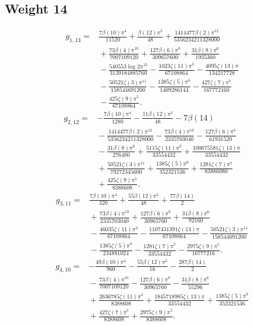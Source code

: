 \subsection*{Weight 14}
\begin{align*}g_{1,13}={}&\frac{7 \beta(10) \pi^{4}}{11520}+\frac{\beta(12) \pi^{2}}{48}+\frac{1414477 \beta(2) \pi^{12}}{5356234211328000}\\
&{}+\frac{73 \beta(4) \pi^{10}}{7007109120}+\frac{127 \beta(6) \pi^{8}}{309657600}+\frac{31 \beta(8) \pi^{6}}{1935360}\\
&{}- \frac{540553 \log 2 \pi^{13}}{3139184885760}- \frac{1023 \zeta(11) \pi^{3}}{67108864}- \frac{4095 \zeta(13) \pi}{134217728}\\
&{}- \frac{50521 \zeta(3) \pi^{11}}{158544691200}- \frac{1385 \zeta(5) \pi^{9}}{1409286144}- \frac{427 \zeta(7) \pi^{7}}{167772160}\\
&{}- \frac{425 \zeta(9) \pi^{5}}{67108864}.\end{align*}
\begin{align*}g_{2,12}={}&- \frac{7 \beta(10) \pi^{4}}{1280}- \frac{11 \beta(12) \pi^{2}}{48}- 7 \beta(14)\\
&{}- \frac{1414477 \beta(2) \pi^{12}}{5356234211328000}- \frac{73 \beta(4) \pi^{10}}{2335703040}- \frac{127 \beta(6) \pi^{8}}{61931520}\\
&{}- \frac{31 \beta(8) \pi^{6}}{276480}+\frac{5115 \zeta(11) \pi^{3}}{33554432}+\frac{100675581 \zeta(13) \pi}{33554432}\\
&{}+\frac{50521 \zeta(3) \pi^{11}}{79272345600}+\frac{1385 \zeta(5) \pi^{9}}{352321536}+\frac{1281 \zeta(7) \pi^{7}}{83886080}\\
&{}+\frac{425 \zeta(9) \pi^{5}}{8388608}.\end{align*}
\begin{align*}g_{3,11}={}&\frac{7 \beta(10) \pi^{4}}{320}+\frac{55 \beta(12) \pi^{2}}{48}+\frac{77 \beta(14)}{2}\\
&{}+\frac{73 \beta(4) \pi^{10}}{2335703040}+\frac{127 \beta(6) \pi^{8}}{30965760}+\frac{31 \beta(8) \pi^{6}}{92160}\\
&{}- \frac{46035 \zeta(11) \pi^{3}}{67108864}- \frac{1107431391 \zeta(13) \pi}{67108864}- \frac{50521 \zeta(3) \pi^{11}}{158544691200}\\
&{}- \frac{1385 \zeta(5) \pi^{9}}{234881024}- \frac{1281 \zeta(7) \pi^{7}}{33554432}- \frac{2975 \zeta(9) \pi^{5}}{16777216}.\end{align*}
\begin{align*}g_{4,10}={}&- \frac{49 \beta(10) \pi^{4}}{960}- \frac{55 \beta(12) \pi^{2}}{16}- \frac{287 \beta(14)}{2}\\
&{}- \frac{73 \beta(4) \pi^{10}}{7007109120}- \frac{127 \beta(6) \pi^{8}}{30965760}- \frac{31 \beta(8) \pi^{6}}{55296}\\
&{}+\frac{2636785 \zeta(11) \pi^{3}}{8388608}+\frac{1845718985 \zeta(13) \pi}{33554432}+\frac{1385 \zeta(5) \pi^{9}}{352321536}\\
&{}+\frac{427 \zeta(7) \pi^{7}}{8388608}+\frac{2975 \zeta(9) \pi^{5}}{8388608}.\end{align*}
